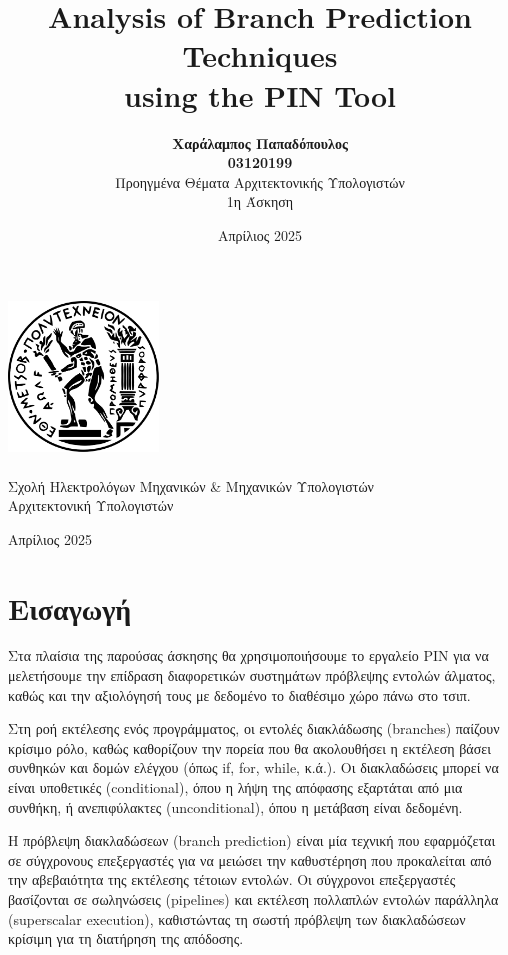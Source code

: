 \documentclass{article}
\title{\Huge Analysis of Branch Prediction Techniques \\[1em] using the PIN Tool}
\author{
  \textbf{Χαράλαμπος Παπαδόπουλος\\ 03120199} \\[3cm]
  {Προηγμένα Θέματα Αρχιτεκτονικής Υπολογιστών\\ 1η Άσκηση} \\
}
\date{Απρίλιος 2025}
\begin{document}
\begin{titlepage}
    \centering
    \vspace{3cm}

    \includegraphics[width=4cm]{figures/emp.png}\\
    \vspace{1.5cm}
    {\fontsize{24pt}{20pt}\selectfont{Εθνικό Μετσόβιο Πολυτεχνείο}}\\[0.3cm]
    {\fontsize{16pt}{18pt}\selectfont Σχολή Ηλεκτρολόγων Μηχανικών \& Μηχανικών Υπολογιστών}\\[0.3cm]
    {\fontsize{16pt}{18pt}\selectfont Αρχιτεκτονική Υπολογιστών}\\[2cm]

    {\Huge\bfseries \thetitle \par}
    \vspace{2cm}
    {\Large \theauthor \par}
    \vfill

    {\fontsize{15pt}{18pt}Απρίλιος 2025}
\end{titlepage}


\newpage

\section{Εισαγωγή}

Στα πλαίσια της παρούσας άσκησης θα χρησιμοποιήσουμε το εργαλείο PIN για να μελετήσουμε την επίδραση διαφορετικών συστημάτων πρόβλεψης εντολών άλματος, καθώς και την αξιολόγησή τους με δεδομένο το διαθέσιμο χώρο πάνω στο τσιπ.

Στη ροή εκτέλεσης ενός προγράμματος, οι εντολές διακλάδωσης (branches) παίζουν κρίσιμο ρόλο, καθώς καθορίζουν την πορεία που θα ακολουθήσει η εκτέλεση βάσει συνθηκών και δομών ελέγχου (όπως if, for, while, κ.ά.). Οι διακλαδώσεις μπορεί να είναι υποθετικές (conditional), όπου η λήψη της απόφασης εξαρτάται από μια συνθήκη, ή ανεπιφύλακτες (unconditional), όπου η μετάβαση είναι δεδομένη.

Η πρόβλεψη διακλαδώσεων (branch prediction) είναι μία τεχνική που εφαρμόζεται σε σύγχρονους επεξεργαστές για να μειώσει την καθυστέρηση που προκαλείται από την αβεβαιότητα της εκτέλεσης τέτοιων εντολών. Οι σύγχρονοι επεξεργαστές βασίζονται σε σωληνώσεις (pipelines) και εκτέλεση πολλαπλών εντολών παράλληλα (superscalar execution), καθιστώντας τη σωστή πρόβλεψη των διακλαδώσεων κρίσιμη για τη διατήρηση της απόδοσης.
\end{document}
